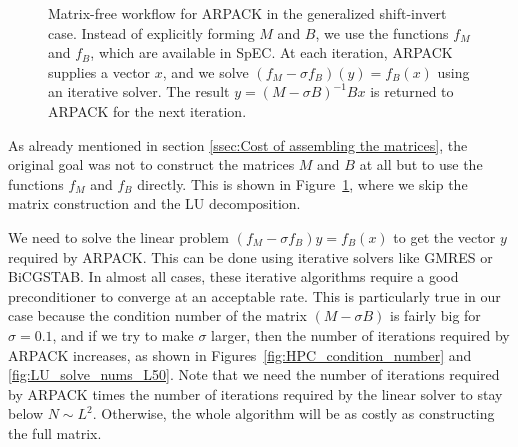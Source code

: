 \documentclass{iopjournal}
\begin{document}
\begin{figure}[h]
\centering
{}
\caption{Matrix-free workflow for ARPACK in the generalized shift-invert case. Instead of explicitly forming $M$ and $B$, we use the functions $f_M$ and $f_B$, which are available in SpEC. At each iteration, ARPACK supplies a vector $x$, and we solve $(f_M - \sigma f_B)(y)=f_B(x)$ using an iterative solver. The result $y = (M-\sigma B)^{-1}Bx$ is returned to ARPACK for the next iteration.}
\label{fig:ARPACK_call_graph_shift_invert_matrix_free}
\end{figure}

As already mentioned in section \ref{ssec:Cost of assembling the matrices}, the original goal was not to construct the matrices $M$ and $B$ at all but to use the functions $f_M$ and $f_B$ directly. This is shown in Figure~\ref{fig:ARPACK_call_graph_shift_invert_matrix_free}, where we skip the matrix construction and the LU decomposition.

We need to solve the linear problem $(f_M - \sigma f_B)y=f_B(x)$ to get the vector $y$ required by ARPACK. This can be done using iterative solvers like GMRES or BiCGSTAB. In almost all cases, these iterative algorithms require a good preconditioner to converge at an acceptable rate. This is particularly true in our case because the condition number of the matrix $(M - \sigma B)$ is fairly big for $\sigma=0.1$, and if we try to make $\sigma$ larger, then the number of iterations required by ARPACK increases, as shown in Figures~\ref{fig:HPC_condition_number} and \ref{fig:LU_solve_nums_L50}. Note that we need the number of iterations required by ARPACK times the number of iterations required by the linear solver to stay below $N\sim L^2$. Otherwise, the whole algorithm will be as costly as constructing the full matrix.
\end{document}
